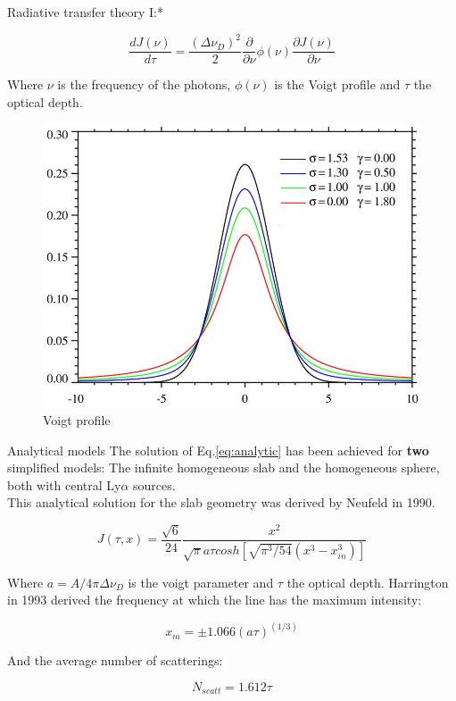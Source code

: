 \documentclass{beamer}
\begin{document}
\begin{frame}{Radiative transfer theory I:*}

\begin{equation}\label{eq:analytic}
\dfrac{d J(\nu)}{d\tau} = \dfrac{(\Delta \nu_D)^2}{2}\dfrac{\partial}{\partial \nu}\phi (\nu) \dfrac{\partial J(\nu)}{\partial \nu}
\end{equation}

Where $\nu$ is the frequency of the photons, $\phi(\nu)$ is the Voigt profile and $\tau$
the optical depth.

\begin{figure}
\includegraphics[scale=0.2]{Figures/voigt.png}
\caption{Voigt profile}
\end{figure}

\end{frame}

\begin{frame}{Analytical models}
The solution of Eq.\ref{eq:analytic} has been achieved for \textbf{two} simplified 
models: The infinite homogeneous slab and the homogeneous sphere, both with central 
Ly$\alpha$ sources.\\

This analytical solution for the slab geometry was derived by Neufeld in 1990.  

\begin{equation}
J(\tau, x) = \dfrac{\sqrt{6}}{24}\dfrac{x^2}{\sqrt{\pi}a \tau cosh[\sqrt{\pi^3/54}(x^3 - x_{in}^3)]}
\end{equation}

Where $a = A / 4\pi \Delta \nu_D$ is the voigt parameter and $\tau$ the optical depth. Harrington in 
1993 derived the frequency at which the line has the maximum intensity:

\[
x_m = \pm 1.066 (a\tau)^(1/3)
\]

And the average number of scatterings:

\[
N_{scatt} = 1.612 \tau
\]

\end{frame}
\end{document}

